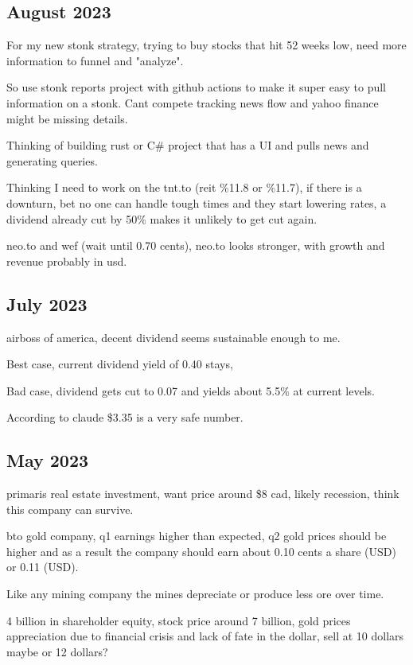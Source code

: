 \subsection{August 2023}

For my new stonk strategy, trying to buy stocks that hit 52 weeks low, need more information to funnel and "analyze".

So use stonk reports project with github actions to make it super easy to pull information on a stonk. Cant compete tracking news flow and yahoo finance might be missing details.

Thinking of building rust or C\# project that has a UI and pulls news and generating queries.

Thinking I need to work on the tnt.to (reit \%11.8 or \%11.7), if there is a downturn, bet no one can handle tough times and they start lowering rates, a dividend already cut by 50\% makes it unlikely to get cut again.

neo.to and wef (wait until 0.70 cents), neo.to looks stronger, with growth and revenue probably in usd.

\subsection{July 2023}

airboss of america, decent dividend seems sustainable enough to me. 

Best case, current dividend yield of 0.40 stays,

Bad case, dividend gets cut to 0.07 and yields about 5.5\% at current levels.

According to claude \$3.35 is a very safe number.

\subsection{May 2023}

primaris real estate investment, want price around \$8 cad, likely recession, think this company can survive.

bto gold company, q1 earnings higher than expected, q2 gold prices should be higher and as a result the company should earn about 0.10 cents a share (USD) or 0.11 (USD).

Like any mining company the mines depreciate or produce less ore over time.

4 billion in shareholder equity, stock price around 7 billion, gold prices appreciation due to financial crisis and lack of fate in the dollar, sell at 10 dollars maybe or 12 dollars?


